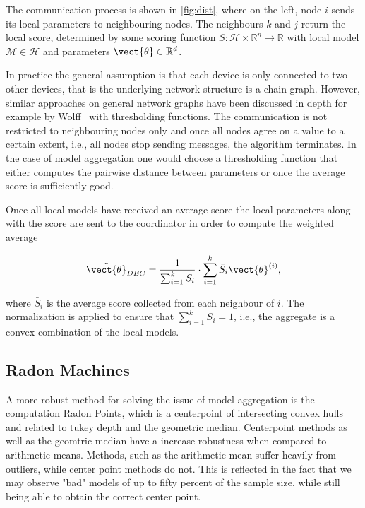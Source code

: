The communication process is shown in \fig \ref{fig:dist}, where on the left, node $i$ sends its local parameters to neighbouring nodes. The neighbours $k$ and $j$ return the local score, determined by some scoring function $S: \mathcal{H} \times \mathbb{R}^n \rightarrow \mathbb{R}$ with local model $\mathcal{M} \in \mathcal{H}$ and parameters $\vect{\theta} \in \mathbb{R}^d$.



In practice the general assumption is that each device is only connected to two other devices, that is the underlying network structure is a chain graph.
However, similar approaches on general network graphs have been discussed in depth for example by Wolff~\cite{wolff2013local} with thresholding functions.
The communication is not restricted to neighbouring nodes only and once all nodes agree on a value to a certain extent, i.e., all nodes stop sending messages, the algorithm terminates.
In the case of model aggregation one would choose a thresholding function that either computes the pairwise distance between parameters or once the average score is sufficiently good.

Once all local models have received an average score the local parameters along with the score are sent to the coordinator in order to compute the weighted average

\begin{equation}
    \tilde{\vect{\theta}}_{DEC} = \frac{1}{\sum_{i=1}^k \bar{S}_i} \cdot \sum_{i=1}^k \bar{S}_i \vect{\theta}^{(i)},
\end{equation}

where $\bar{S}_i$ is the average score collected from each neighbour of $i$. 
The normalization is applied to ensure that $\sum_{i=1}^k S_i = 1$, i.e., the aggregate is a convex combination of the local models.

\subsection{Radon Machines}

A more robust method for solving the issue of model aggregation is the computation Radon Points, which is a centerpoint of intersecting convex hulls and related to tukey depth and the geometric median. 
Centerpoint methods as well as the geomtric median have a increase robustness when compared to arithmetic means.
Methods, such as the arithmetic mean suffer heavily from outliers, while center point methods do not.
This is reflected in the fact that we may observe "bad" models of up to fifty percent of the sample size, while still being able to obtain the correct center point.

